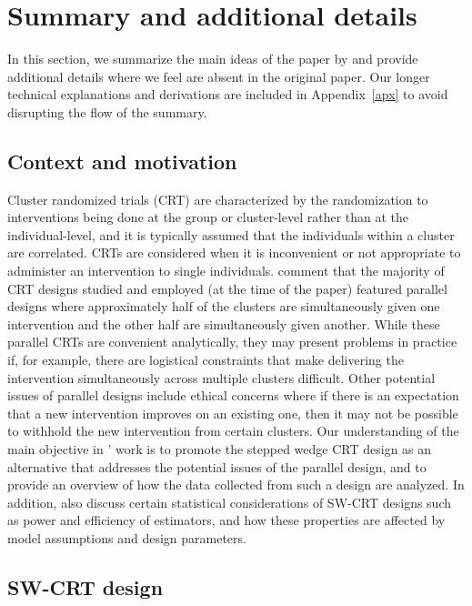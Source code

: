 \documentclass[10pt]{article}
\begin{document}
\section{Summary and additional details} \label{sec:summary}

In this section, we summarize the main ideas of the paper by \textcite{Hussey:2007} and provide additional details where we feel are absent in the original paper. Our longer technical explanations and derivations are included in Appendix~\ref{apx} to avoid disrupting the flow of the summary.

\subsection{Context and motivation}

Cluster randomized trials (CRT) are characterized by the randomization to interventions being done at the group or cluster-level rather than at the individual-level, and it is typically assumed that the individuals within a cluster are correlated. CRTs are considered when it is inconvenient or not appropriate to administer an intervention to single individuals. \textcite{Hussey:2007} comment that the majority of CRT designs studied and employed (at the time of the paper) featured parallel designs where approximately half of the clusters are simultaneously given one intervention and the other half are simultaneously given another. While these parallel CRTs are convenient analytically, they may present problems in practice if, for example, there are logistical constraints that make delivering the intervention simultaneously across multiple clusters difficult. Other potential issues of parallel designs include ethical concerns where if there is an expectation that a new intervention improves on an existing one, then it may not be possible to withhold the new intervention from certain clusters. Our understanding of the main objective in \citeauthor{Hussey:2007}' work is to promote the stepped wedge CRT design as an alternative that addresses the potential issues of the parallel design, and to provide an overview of how the data collected from such a design are analyzed. In addition, \citeauthor{Hussey:2007} also discuss certain statistical considerations of SW-CRT designs such as power and efficiency of estimators, and how these properties are affected by model assumptions and design parameters.

\subsection{SW-CRT design}
\end{document}
